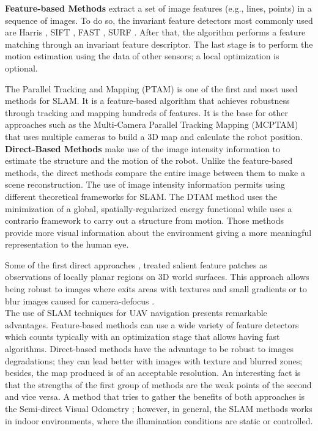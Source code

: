 \textbf{Feature-based Methods} extract a set of image features (e.g., lines, points) in a sequence of images. To do so, the invariant feature detectors most commonly used are Harris \cite{Harris.Stephens:AVC:1988}, SIFT \cite{Lowe:ICCV:1999}, FAST \cite{Rosten.Drummond:ECCV:2006}, SURF \cite{Bay.Ess.ea:CVIU:2008}. After that, the algorithm performs a feature matching through an invariant feature descriptor. The last stage is to perform the motion estimation using the data of other sensors; a local optimization is optional. 

The Parallel Tracking and Mapping (PTAM) \cite{Klein.Murray:ISMAR:2007} is one of the first and most used methods for SLAM. It is a feature-based algorithm that achieves robustness through tracking and mapping hundreds of features. It is the base for other approaches such as the Multi-Camera Parallel Tracking Mapping (MCPTAM) \cite{Harmat.Trentini.ea:IROS:2015} that uses multiple cameras to build a 3D map and calculate the robot position. \\

\textbf{Direct-Based Methods} make use of the image intensity information to estimate the structure and the motion of the robot. Unlike the feature-based methods, the direct methods compare the entire image between them to make a scene reconstruction. The use of image intensity information permits using different theoretical frameworks for SLAM. The DTAM method \cite{Newcombe.Lovegrove.ea:ICCV:2011} uses the minimization of a global, spatially-regularized energy functional while \cite{Moulon.Monasse.ea:ACCV:2012} uses a contrario framework to carry out a structure from motion.
Those methods provide more visual information about the environment giving a more meaningful representation to the human eye. 

Some of the first direct approaches \cite{Jin.Favaro.ea:VC:2003}, \cite{Molton.Davison.ea:BMVC:2004} treated salient feature patches as observations of locally planar regions on 3D world surfaces. This approach allows being robust to images where exits areas with textures and small gradients \cite{Lovegrove.Davison.ea:IVS:2011} or to blur images caused for camera-defocus \cite{Newcombe.Lovegrove.ea:ICCV:2011}.\\

The use of SLAM techniques for UAV navigation presents remarkable advantages. Feature-based methods can use a wide variety of feature detectors which counts typically with an optimization stage that allows having fast algorithms. Direct-based methods have the advantage to be robust to images degradations; they can lead better with images with texture and blurred zones; besides, the map produced is of an acceptable resolution. An interesting fact is that the strengths of the first group of methods are the weak points of the second and vice versa. A method that tries to gather the benefits of both approaches is the Semi-direct Visual Odometry \cite{Forster.Pizzoli.ea:ICRA:2014}; however, in general, the SLAM methods works in indoor environments, where the illumination conditions are static or controlled.\\

